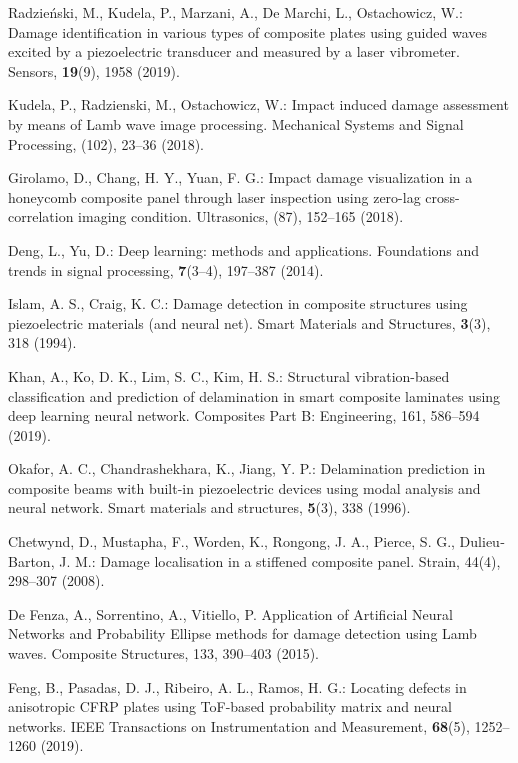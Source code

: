 \documentclass{IOS-Book-Article}
\begin{document}
\begin{thebibliography}{8}
	Radzieński, M., Kudela, P., Marzani, A., De Marchi, L., Ostachowicz, W.: Damage 
	identification in various types of composite plates using guided waves excited 
	by a piezoelectric transducer and measured by a laser vibrometer. Sensors,  
	\textbf{19}(9), 1958 (2019).
	
	Kudela, P., Radzienski, M., Ostachowicz, W.: Impact induced damage assessment 
	by means of Lamb wave image processing. Mechanical Systems and Signal 
	Processing, (102), 23--36 (2018).
	
	Girolamo, D., Chang, H. Y., Yuan, F. G.: Impact damage visualization in a 
	honeycomb composite panel through laser inspection using zero-lag 
	cross-correlation imaging condition. Ultrasonics, (87), 152--165 (2018).
	
	Deng, L., Yu, D.: Deep learning: methods and applications. Foundations and 
	trends in signal processing, \textbf{7}(3–4), 197--387 (2014).
	
	Islam, A. S., Craig, K. C.: Damage detection in composite structures using 
	piezoelectric materials (and neural net). Smart Materials and Structures, 
	\textbf{3}(3), 318 (1994).
	
	Khan, A., Ko, D. K., Lim, S. C., Kim, H. S.: Structural vibration-based 
	classification and prediction of delamination in smart composite laminates 
	using deep learning neural network. Composites Part B: Engineering, 161, 
	586--594 (2019).
	
	Okafor, A. C., Chandrashekhara, K., Jiang, Y. P.: Delamination prediction in 
	composite beams with built-in piezoelectric devices using modal analysis and 
	neural network. Smart materials and structures, \textbf{5}(3), 338  (1996).
	
	Chetwynd, D., Mustapha, F., Worden, K., Rongong, J. A., Pierce, S. G., 
	Dulieu‐Barton, J. M.: Damage localisation in a stiffened composite panel. 
	Strain, 44(4), 298--307 (2008).
	
	De Fenza, A., Sorrentino, A., Vitiello, P. Application of Artificial Neural 
	Networks and Probability Ellipse methods for damage detection using Lamb waves. 
	Composite Structures, 133, 390--403 (2015).
	
	Feng, B., Pasadas, D. J., Ribeiro, A. L., Ramos, H. G.: Locating defects in 
	anisotropic CFRP plates using ToF-based probability matrix and neural networks. 
	IEEE Transactions on Instrumentation and Measurement, \textbf{68}(5), 
	1252--1260 (2019).
	

\end{thebibliography}
\end{document}
